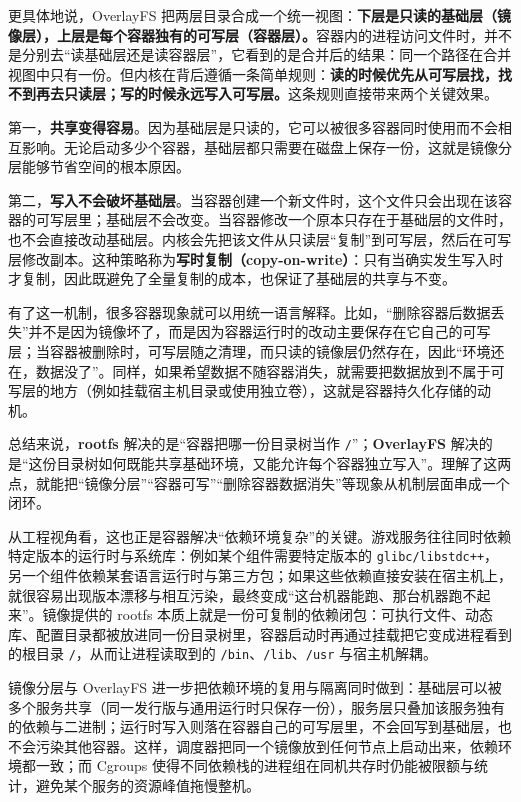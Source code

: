更具体地说，OverlayFS 把两层目录合成一个统一视图：\textbf{下层是只读的基础层（镜像层），上层是每个容器独有的可写层（容器层）。}容器内的进程访问文件时，并不是分别去“读基础层还是读容器层”，它看到的是合并后的结果：同一个路径在合并视图中只有一份。但内核在背后遵循一条简单规则：\textbf{读的时候优先从可写层找，找不到再去只读层；写的时候永远写入可写层。}这条规则直接带来两个关键效果。

第一，\textbf{共享变得容易}。因为基础层是只读的，它可以被很多容器同时使用而不会相互影响。无论启动多少个容器，基础层都只需要在磁盘上保存一份，这就是镜像分层能够节省空间的根本原因。

第二，\textbf{写入不会破坏基础层}。当容器创建一个新文件时，这个文件只会出现在该容器的可写层里；基础层不会改变。当容器修改一个原本只存在于基础层的文件时，也不会直接改动基础层。内核会先把该文件从只读层“复制”到可写层，然后在可写层修改副本。这种策略称为\textbf{写时复制（copy-on-write）}：只有当确实发生写入时才复制，因此既避免了全量复制的成本，也保证了基础层的共享与不变。

有了这一机制，很多容器现象就可以用统一语言解释。比如，“删除容器后数据丢失”并不是因为镜像坏了，而是因为容器运行时的改动主要保存在它自己的可写层；当容器被删除时，可写层随之清理，而只读的镜像层仍然存在，因此“环境还在，数据没了”。同样，如果希望数据不随容器消失，就需要把数据放到不属于可写层的地方（例如挂载宿主机目录或使用独立卷），这就是容器持久化存储的动机。

总结来说，\textbf{rootfs} 解决的是“容器把哪一份目录树当作 \texttt{/}”；\textbf{OverlayFS} 解决的是“这份目录树如何既能共享基础环境，又能允许每个容器独立写入”。理解了这两点，就能把“镜像分层”“容器可写”“删除容器数据消失”等现象从机制层面串成一个闭环。

从工程视角看，这也正是容器解决“依赖环境复杂”的关键。游戏服务往往同时依赖特定版本的运行时与系统库：例如某个组件需要特定版本的 \texttt{glibc/libstdc++}，另一个组件依赖某套语言运行时与第三方包；如果这些依赖直接安装在宿主机上，就很容易出现版本漂移与相互污染，最终变成“这台机器能跑、那台机器跑不起来”。镜像提供的 rootfs 本质上就是一份可复制的依赖闭包：可执行文件、动态库、配置目录都被放进同一份目录树里，容器启动时再通过挂载把它变成进程看到的根目录 \texttt{/}，从而让进程读取到的 \texttt{/bin}、\texttt{/lib}、\texttt{/usr} 与宿主机解耦。

镜像分层与 OverlayFS 进一步把依赖环境的复用与隔离同时做到：基础层可以被多个服务共享（同一发行版与通用运行时只保存一份），服务层只叠加该服务独有的依赖与二进制；运行时写入则落在容器自己的可写层里，不会回写到基础层，也不会污染其他容器。这样，调度器把同一个镜像放到任何节点上启动出来，依赖环境都一致；而 Cgroups 使得不同依赖栈的进程组在同机共存时仍能被限额与统计，避免某个服务的资源峰值拖慢整机。

